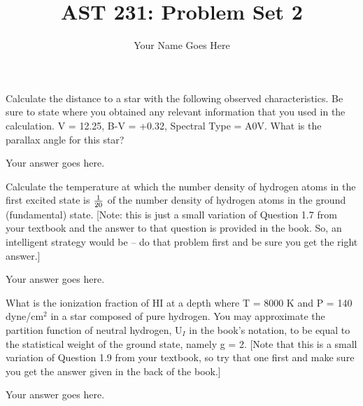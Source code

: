 \documentclass[12pt]{article}
\newenvironment{problem}[2][Problem]{\begin{trivlist}
\item[\hskip \labelsep {\bfseries #1}\hskip \labelsep {\bfseries #2.}]}{\end{trivlist}}
\newenvironment{answer}[2][Answer]{\begin{trivlist}
\item[\hskip \labelsep {\bfseries #1}\hskip \labelsep {\bfseries #2.}]}{\end{trivlist}}
\begin{document}
 
 
\title{AST 231: Problem Set 2}
\author{Your Name Goes Here}
\maketitle
 
\begin{problem}{1}
Calculate the distance to a star with the following observed characteristics. Be sure to state where you obtained any relevant information that you used in the calculation. V = 12.25, B-V = +0.32, Spectral Type = A0V. What is the parallax angle for this star?
\end{problem}

\begin{answer}{1}
Your answer goes here. 
\end{answer}

\begin{problem}{2}
Calculate the temperature at which the number density of hydrogen atoms in the first excited state is $1 \over 20$ of the number density of hydrogen atoms in the ground (fundamental) state. [Note: this is just a small variation of Question 1.7 from your textbook and the answer to that question is provided in the book. So, an intelligent strategy would be -- do that problem first and be sure you get the right answer.]  
\end{problem}

\begin{answer}{2}
Your answer goes here. 
\end{answer}

\begin{problem}{3}
What is the ionization fraction of HI at a depth where T = 8000 K and P = 140 dyne/cm$^2$ in a star composed of pure hydrogen. You may approximate the partition function of neutral hydrogen, U$_I$ in the book's notation, to be equal to the statistical weight of the ground state, namely g = 2. [Note that this is a small variation of Question 1.9 from your textbook, so try that one first and make sure you get the answer given in the back of the book.]
\end{problem}

\begin{answer}{3}
Your answer goes here. 
\end{answer}
\end{document}
